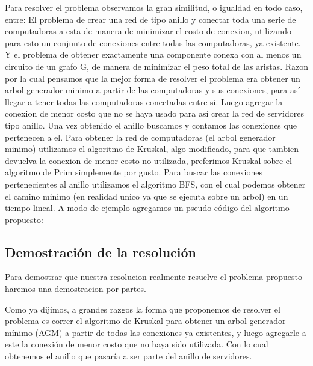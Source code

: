 Para resolver el problema observamos la gran similitud, o igualdad en todo caso, entre:
El problema de crear una red de tipo anillo y conectar toda una serie de computadoras a esta de manera de minimizar el costo de conexion, utilizando para esto un conjunto de conexiones entre todas las computadoras, ya existente.
Y el problema de obtener exactamente una componente conexa con al menos un circuito de un grafo G, de manera de minimizar el peso total de las aristas. Razon por la cual pensamos que la mejor forma de resolver el problema era obtener un arbol generador minimo a partir de las computadoras y sus conexiones, para así llegar a tener todas las computadoras conectadas entre si. Luego agregar la conexion de menor costo que no se haya usado para así crear la red de servidores tipo anillo.
Una vez obtenido el anillo buscamos y contamos las conexiones que pertenecen a el.
Para obtener la red de computadoras (el arbol generador minimo) utilizamos el algoritmo de Kruskal, algo modificado, para que tambien devuelva la conexion de menor costo no utilizada, preferimos Kruskal sobre el algoritmo de Prim simplemente por gusto. Para buscar las conexiones pertenecientes al anillo utilizamos el algoritmo BFS, con el cual podemos obtener el camino minimo (en realidad unico ya que se ejecuta sobre un arbol) en un tiempo lineal.
A modo de ejemplo agregamos un pseudo-código del algoritmo propuesto:

\begin{itemize}

\end{itemize}


\newpage


\subsection{Demostraci\'on de la resoluci\'on}

Para demostrar que nuestra resolucion realmente resuelve el problema propuesto haremos una demostracion por partes.

Como ya dijimos, a grandes razgos la forma que proponemos de resolver el problema es correr el algoritmo de Kruskal para obtener un arbol generador mínimo (AGM) a partir de todas las conexiones ya existentes, y luego agregarle a este la conexión de menor costo que no haya sido utilizada. Con lo cual obtenemos el anillo que pasaría a ser parte del anillo de servidores.

